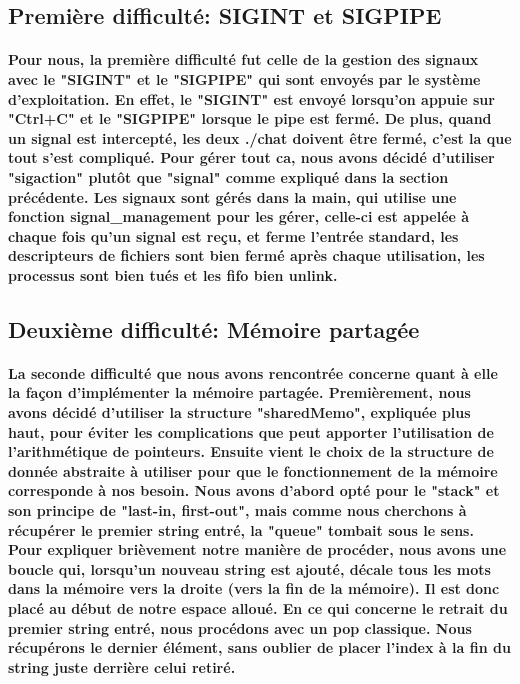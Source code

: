 \documentclass[utf8]{article}
\begin{document}
\subsection{Première difficulté: SIGINT et SIGPIPE}
\paragraph{Pour nous, la première difficulté fut celle de la gestion des signaux avec le "SIGINT" et le "SIGPIPE"
qui sont envoyés par le système d'exploitation. En effet, le "SIGINT" est envoyé lorsqu'on appuie sur "Ctrl+C" et le "SIGPIPE" lorsque le pipe est fermé.
De plus, quand un signal est intercepté, les deux ./chat doivent être fermé, c'est la que tout s'est compliqué.
Pour gérer tout ca, nous avons décidé d'utiliser "sigaction" plutôt que "signal" comme expliqué dans la section précédente.
Les signaux sont gérés dans la main, qui utilise une fonction signal\_management pour les gérer, celle-ci est appelée à chaque fois qu'un signal est reçu, 
et ferme l'entrée standard, les descripteurs de fichiers sont bien fermé après chaque utilisation, les processus sont bien tués et les fifo bien unlink.}

\subsection{Deuxième difficulté: Mémoire partagée}
\paragraph{La seconde difficulté que nous avons rencontrée concerne quant à elle la façon d'implémenter la mémoire partagée. Premièrement, nous avons décidé
d'utiliser la structure "sharedMemo", expliquée plus haut, pour éviter les complications que peut apporter l'utilisation de l'arithmétique de pointeurs. Ensuite
vient le choix de la structure de donnée abstraite à utiliser pour que le fonctionnement de la mémoire corresponde à nos besoin. Nous avons d'abord opté pour
le "stack" et son principe de "last-in, first-out", mais comme nous cherchons à récupérer le premier string entré, la "queue" tombait sous le sens. Pour expliquer
brièvement notre manière de procéder, nous avons une boucle qui, lorsqu'un nouveau string est ajouté, décale tous les mots dans la mémoire vers la droite (vers la 
fin de la mémoire). Il est donc placé au début de notre espace alloué. En ce qui concerne le retrait du premier string entré, nous procédons avec un pop classique. Nous 
récupérons le dernier élément, sans oublier de placer l'index à la fin du string juste derrière celui retiré.}
\end{document}

